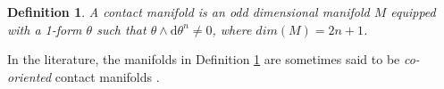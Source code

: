 \documentclass[10pt]{amsart}
\numberwithin{equation}{section}
\newcommand{\rd}{\mathrm{d}}
\newtheorem{definition}{Definition}
\theoremstyle{definition}
\newtheorem{remark}{\textbf{Remark}}
\begin{document}
\begin{definition}
\label{deContact}
A contact manifold is an odd dimensional manifold $M$ equipped with a 1-form $\theta$ such that $\theta\wedge \rd \theta^{n}\neq 0$, where $dim(M)=2n+1$. 
\end{definition}
In the literature, the manifolds in Definition \ref{deContact} are sometimes said to be \textit{co-oriented} contact manifolds \cite{LL2020,G2008,GrGr2022}.


\end{document}
